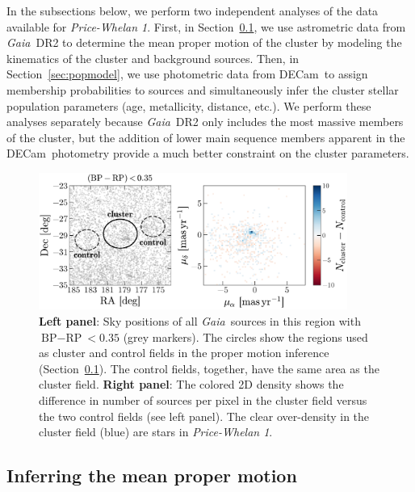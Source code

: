 \documentclass[twocolumn]{aastex62}
\newcommand{\acronym}[1]{{\small{#1}}}
\newcommand{\gaia}{\textsl{Gaia}}
\newcommand{\decam}{DECam}
\newcommand{\DR}[1]{\acronym{DR#1}}
\newcommand{\sectionname}{Section}
\newcommand{\clustername}{\textsl{Price-Whelan 1}}
\newcommand{\bprp}{\ensuremath{\textrm{BP} - \textrm{RP}}}
\begin{document}
In the subsections below, we perform two independent analyses of the data available for \clustername.
First, in \sectionname~\ref{sec:pmclean}, we use astrometric data from \gaia\ \DR{2} to determine the mean proper motion of the cluster by modeling the kinematics of the cluster and background sources.
Then, in \sectionname~\ref{sec:popmodel}, we use photometric data from \decam\ to assign membership probabilities to sources and simultaneously infer the cluster stellar population parameters (age, metallicity, distance, etc.).
We perform these analyses separately because \gaia\ \DR{2} only includes the most massive members of the cluster, but the addition of lower main sequence members apparent in the \decam\ photometry provide a much better constraint on the cluster parameters.


\begin{figure}[t!]
\centering
\includegraphics[width=0.9\textwidth]{figures/pm-model.pdf}
\caption{\textbf{Left panel}: Sky positions of all \gaia\ sources in this region with $\bprp < 0.35$ (grey markers).
The circles show the regions used as cluster and control fields in the proper motion inference (\sectionname~\ref{sec:pmclean}).
The control fields, together, have the same area as the cluster field.
\textbf{Right panel}: The colored 2D density shows the difference in number of sources per pixel in the cluster field versus the two control fields (see left panel).
The clear over-density in the cluster field (blue) are stars in \clustername.}
\label{fig:pm-members}
\end{figure}

\subsection{Inferring the mean proper motion}
\label{sec:pmclean}
\end{document}

